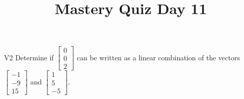 \documentclass{sbgLAquiz}
\title{Mastery Quiz Day 11 }
\begin{document}
\begin{problem}{V2}
Determine if  $\begin{bmatrix} 0 \\ 0 \\ 2 \end{bmatrix}$ can be written as a linear combination of the vectors $\begin{bmatrix} -1 \\ -9 \\ 15 \end{bmatrix}$ and $\begin{bmatrix} 1 \\ 5 \\ -5 \end{bmatrix}$.
\end{problem}
\begin{solution}
\end{solution}
\end{document}
